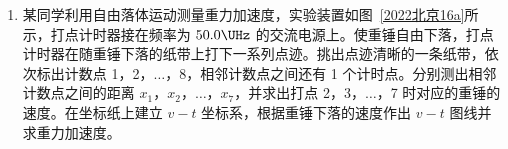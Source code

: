 \documentclass[\gkver]{gaokaozhenti}
\begin{document}
\begin{enumerate}
\begin{enumerate}
	A．将选择开关置于“$\times1$ k”位置

	B．将选择开关置于“OFF”位置

	C．将两表笔分别接触待测电阻两端，读出其阻值后随即断开

	D．将两表笔直接接触，调节欧姆调零旋钮，使指针指向“0”
	\item
	图~\ref{2022北京15c} 是“测量电源的电动势和内电阻”实验的电路图。某同学在实验中，闭合开关后，发现无论怎么移动滑动变阻器的滑片，电压表有示数且不变，电流表始终没有示数。为查找故障，在其他连接不变的情况下，他将电压表连接 a 位置的导线端分别试触 b、c、d 三个位置，发现试触 b、c 时，电压表有示数；试触 d 时，电压表没有示数。若电路中仅有一处故障，则（选填选项前的字母）。

	A．导线 ab 断路

	B．滑动变阻器断路

	C．导线 cd 断路

	D．滑动变阻器短路

\end{enumerate}


\item
某同学利用自由落体运动测量重力加速度，实验装置如图~\ref{2022北京16a}所示，打点计时器接在频率为 $50.0\UHz$ 的交流电源上。使重锤自由下落，打点计时器在随重锤下落的纸带上打下一系列点迹。挑出点迹清晰的一条纸带，依次标出计数点 1，2，$\ldots$，8，相邻计数点之间还有 1 个计时点。分别测出相邻计数点之间的距离 $x_{1}$，$x_{2}$，$\ldots$，$x_{7}$，并求出打点 2，3，$\ldots$，7 时对应的重锤的速度。在坐标纸上建立 $v-t$ 坐标系，根据重锤下落的速度作出 $v-t$ 图线并求重力加速度。


\end{enumerate}
\end{document}
